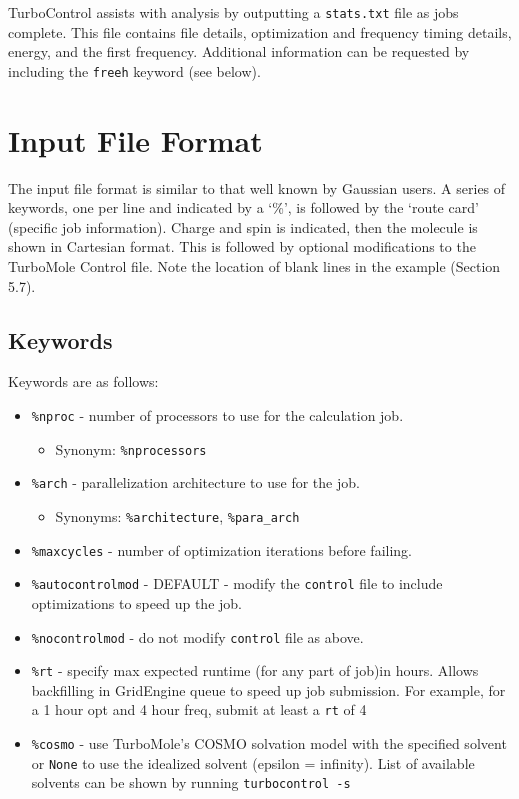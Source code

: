 TurboControl assists with analysis by outputting a \texttt{stats.txt} file as jobs complete. This file contains file details, optimization and frequency timing details, energy, and the first frequency. Additional information can be requested by including the \texttt{freeh} keyword (see below).

\section{Input File Format}

The input file format is similar to that well known by Gaussian users. A series of keywords, one per line and indicated by a `\%', is followed by the `route card' (specific job information). Charge and spin is indicated, then the molecule is shown in Cartesian format. This is followed by optional modifications to the TurboMole Control file. Note the location of blank lines in the example (Section 5.7).

\subsection{Keywords}

Keywords are as follows:

\begin{itemize}
\item \texttt{\%nproc} - number of processors to use for the calculation job.
  \begin{itemize}
    \item Synonym: \texttt{\%nprocessors}
  \end{itemize}
\item \texttt{\%arch} - parallelization architecture to use for the job.
  \begin{itemize}
    \item Synonyms: \texttt{\%architecture}, \texttt{\%para\_arch}
   \end {itemize}
\item \texttt{\%maxcycles} - number of optimization iterations before failing.
\item \texttt{\%autocontrolmod} - DEFAULT - modify the \texttt{control} file to include optimizations to speed up the job.
\item \texttt{\%nocontrolmod} - do not modify \texttt{control} file as above.
\item \texttt{\%rt} - specify max expected runtime (for any part of job)in hours. Allows backfilling in GridEngine queue to speed up job submission. For example, for a 1 hour opt and 4 hour freq, submit at least a \texttt{rt} of 4
\item \texttt{\%cosmo} - use TurboMole's COSMO solvation model with the specified solvent or \texttt{None} to use the idealized solvent (epsilon = infinity). List of available solvents can be shown by running \texttt{turbocontrol -s}
\end{itemize}

